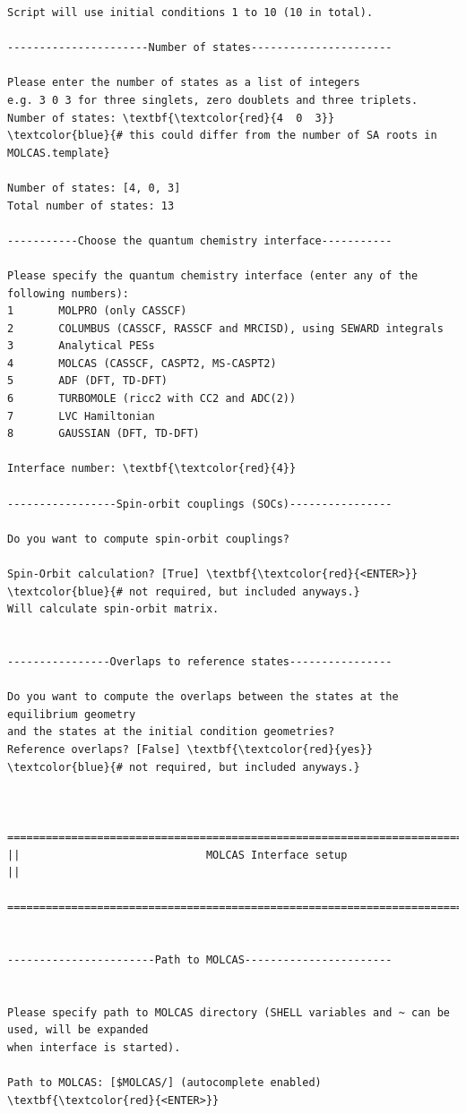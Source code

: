 \documentclass[a4paper,11pt,DIV=15,openany]{scrbook}
\begin{document}
\begin{oframed}
\begin{Verbatim}[commandchars=\\\{\}]
Script will use initial conditions 1 to 10 (10 in total).

----------------------Number of states----------------------

Please enter the number of states as a list of integers
e.g. 3 0 3 for three singlets, zero doublets and three triplets.
Number of states: \textbf{\textcolor{red}{4  0  3}}     \textcolor{blue}{# this could differ from the number of SA roots in MOLCAS.template}

Number of states: [4, 0, 3]
Total number of states: 13

-----------Choose the quantum chemistry interface-----------

Please specify the quantum chemistry interface (enter any of the following numbers):
1       MOLPRO (only CASSCF)
2       COLUMBUS (CASSCF, RASSCF and MRCISD), using SEWARD integrals
3       Analytical PESs
4       MOLCAS (CASSCF, CASPT2, MS-CASPT2)
5       ADF (DFT, TD-DFT)
6       TURBOMOLE (ricc2 with CC2 and ADC(2))
7       LVC Hamiltonian
8       GAUSSIAN (DFT, TD-DFT)

Interface number: \textbf{\textcolor{red}{4}}

-----------------Spin-orbit couplings (SOCs)----------------

Do you want to compute spin-orbit couplings?

Spin-Orbit calculation? [True] \textbf{\textcolor{red}{<ENTER>}}     \textcolor{blue}{# not required, but included anyways.}
Will calculate spin-orbit matrix.


----------------Overlaps to reference states----------------

Do you want to compute the overlaps between the states at the equilibrium geometry 
and the states at the initial condition geometries?
Reference overlaps? [False] \textbf{\textcolor{red}{yes}}    \textcolor{blue}{# not required, but included anyways.}


  ================================================================================
||                             MOLCAS Interface setup                             ||
  ================================================================================


-----------------------Path to MOLCAS-----------------------


Please specify path to MOLCAS directory (SHELL variables and ~ can be used, will be expanded 
when interface is started).

Path to MOLCAS: [$MOLCAS/] (autocomplete enabled) \textbf{\textcolor{red}{<ENTER>}}


\end{Verbatim}
\end{oframed}
\end{document}
